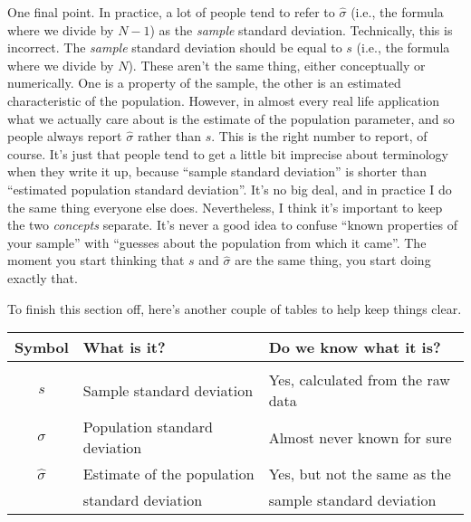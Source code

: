 One final point. In practice, a lot of people tend to refer to $\hat{\sigma}$ (i.e., the formula where we divide by $N-1$) as the {\it sample} standard deviation. Technically, this is incorrect. The {\it sample} standard deviation should be equal to $s$ (i.e., the formula where we divide by $N$). These aren't the same thing, either conceptually or numerically. One is a property of the sample, the other is an estimated characteristic of the population. However, in almost every real life application what we actually care about is the estimate of the population parameter, and so people always report $\hat\sigma$ rather than $s$. This is the right number to report, of course. It's just that people tend to get a little bit imprecise about terminology when they write it up, because ``sample standard deviation'' is shorter than ``estimated population standard deviation''. It's no big deal, and in practice I do the same thing everyone else does. Nevertheless, I think it's important to keep the two {\it concepts} separate. It's never a good idea to confuse ``known properties of your sample'' with ``guesses about the population from which it came''. The moment you start thinking that $s$ and $\hat\sigma$ are the same thing, you start doing exactly that. 

To finish this section off, here's another couple of tables to help keep things clear.

\begin{center}
\small 
\begin{tabular}{cll}
\hline
Symbol           & What is it?                   & Do we know what it is?            \\
\hline \\[-6pt]
$s$              & Sample standard deviation     & Yes, calculated from the raw data \\
$\sigma$         & Population standard deviation & Almost never known for sure       \\
$\hat{\sigma}$   & Estimate of the population    & Yes, but not the same as the      \\
~                & standard deviation            & sample standard deviation         \\
\hline
\end{tabular}
\end{center}\vspace{0.5cm}

